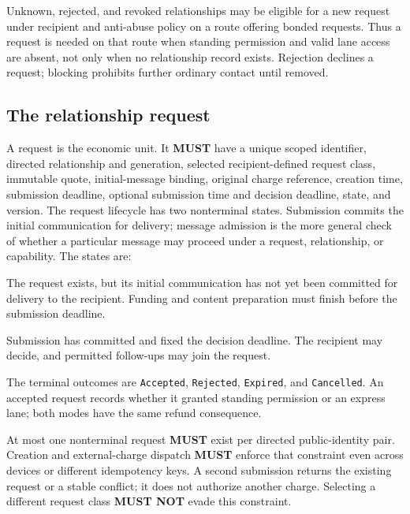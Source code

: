 \documentclass[11pt]{article}
\newcommand{\MUST}{\textbf{MUST}}
\newcommand{\MUSTNOT}{\textbf{MUST NOT}}
\begin{document}
Unknown, rejected, and revoked relationships may be eligible for a new request
under recipient and anti-abuse policy on a route offering bonded requests. Thus
a request is needed on that route when standing permission and valid lane access
are absent, not only when no relationship
record exists. Rejection
declines a request; blocking prohibits further ordinary contact until removed.

\subsection{The relationship request}

A request is the economic unit. It \MUST{} have a unique scoped identifier,
directed relationship and generation, selected recipient-defined request class,
immutable quote, initial-message binding,
original charge reference, creation time, submission deadline, optional submission
time and decision deadline, state, and version. The request lifecycle has two
nonterminal states. Submission commits the initial communication for delivery;
message admission is the more general check of whether a particular message
may proceed under a request, relationship, or capability. The states are:
\begin{description}[leftmargin=1.5em,style=nextline]
\item[\texttt{PreparingSubmission}] The request exists, but its initial
communication has not yet been committed for delivery to the recipient. Funding
and content preparation must finish before the submission deadline.
\item[\texttt{AwaitingRecipientDecision}] Submission has committed and fixed the
decision deadline. The recipient may decide, and permitted follow-ups may join
the request.
\end{description}
The terminal outcomes are \texttt{Accepted}, \texttt{Rejected},
\texttt{Expired}, and \texttt{Cancelled}.
An accepted request records whether it granted standing permission or an express
lane; both modes have the same refund consequence.

At most one nonterminal request
\MUST{} exist per directed public-identity pair. Creation and external-charge
dispatch \MUST{} enforce that constraint even across devices or different
idempotency keys. A second submission returns the existing request or a stable
conflict; it does not authorize another charge. Selecting a different request
class \MUSTNOT{} evade this constraint.
\end{document}

